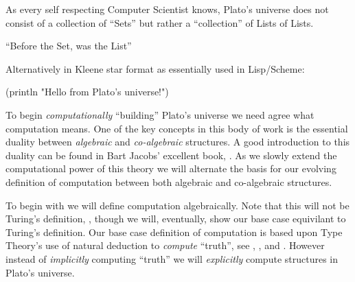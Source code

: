 
As every self respecting Computer Scientist knows, Plato's universe does not
consist of a collection of ``Sets'' but rather a ``collection'' of Lists of
Lists.

``Before the Set, was the List''

\begin{bnf*}
\end{bnf*}

Alternatively in Kleene star format as essentially used in Lisp/Scheme:

\begin{bnf*}
\end{bnf*}

\begin{racket}
(println "Hello from Plato's universe!")
\end{racket}

To begin \emph{computationally} ``building'' Plato's universe we need agree what
computation means. One of the key concepts in this body of work is the essential
duality between \emph{algebraic} and \emph{co-algebraic} structures. A good
introduction to this duality can be found in Bart Jacobs' excellent book,
\cite{jacobs2012coalg}. As we slowly extend the computational power of this
theory we will alternate the basis for our evolving definition of computation
between both algebraic and co-algebraic structures.

To begin with we will define computation algebraically. Note that this will not
be Turing's definition, \cite{turing1936computableNumbersMachines}, though we
will, eventually, show our base case equivilant to Turing's definition. Our base
case definition of computation is based upon Type Theory's use of natural
deduction to \emph{compute} ``truth'', see \cite{gentzen1969collectedPapers},
\cite{kleene2009introMetaMathematics}, and
\cite{awodeyCoquandVoevodsky2013homotopyTypeTheory}. However instead of
\emph{implicitly} computing ``truth'' we will \emph{explicitly} compute
structures in Plato's universe.

